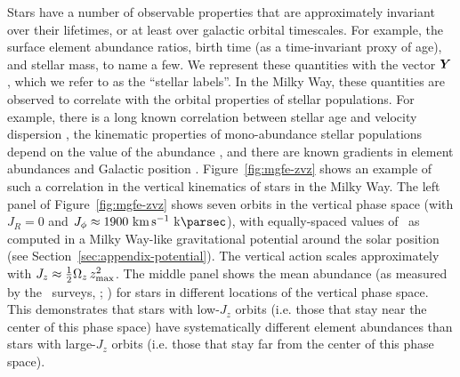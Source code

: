 \documentclass[modern]{aastex631}
\begin{document}
Stars have a number of observable properties that are approximately invariant over their
lifetimes, or at least over galactic orbital timescales.
For example, the surface element abundance ratios, birth time (as a time-invariant proxy
of age), and stellar mass, to name a few.
We represent these quantities with the vector $\boldsymbol{Y}$, which we refer to as the
``stellar labels''.
In the Milky Way, these quantities are observed to correlate with the orbital
properties of stellar populations.
For example, there is a long known correlation between stellar age and velocity
dispersion \citep{Spitzer:1951, Sharma:2021}, the kinematic properties of mono-abundance
stellar populations depend on the value of the abundance \citep{Bovy:2016, Yu:2021,
Lian:2022}, and there are known gradients in element abundances and Galactic position
\citep[e.g.,][]{Shaver:1983, Maciel:1999, Eilers:2022, Lian:2023}.
Figure~\ref{fig:mgfe-zvz} shows an example of such a correlation in the vertical
kinematics of stars in the Milky Way.
The left panel of Figure~\ref{fig:mgfe-zvz} shows seven orbits in the vertical phase
space (with $J_R=0$ and $J_\phi \approx 1900~\kms~\kpc$), with equally-spaced values of
\zmax\ as computed in a Milky Way-like gravitational potential around the solar position
(see Section~\ref{sec:appendix-potential}).
The vertical action scales approximately with $J_z \approx \frac{1}{2} \Omega_z \,
z_{\textrm{max}}^2$.
The middle panel shows the mean  abundance (as measured by the \apogee\
surveys, ; \citealt{APOGEE:2017, APOGEE:DR17}) for stars in different locations
of the vertical phase space.
This demonstrates that stars with low-$J_z$ orbits (i.e. those that stay near the center
of this phase space) have systematically different element abundances than stars with
large-$J_z$ orbits (i.e. those that stay far from the center of this phase space).


\end{document}
